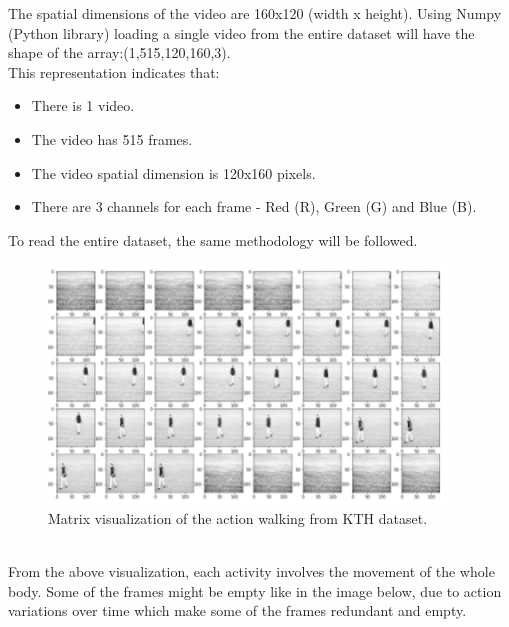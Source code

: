 The spatial dimensions of the video are 160x120 (width x height). Using Numpy (Python library) loading a single video from the entire dataset will have the shape of the array:(1,515,120,160,3).\\
This representation indicates that:
\begin{itemize}
\item There is 1 video.
\item The video has 515 frames.
\item The video spatial dimension is 120x160 pixels.
\item There are 3 channels for each frame - Red (R), Green (G) and Blue (B).
\end{itemize}
To read the entire dataset, the same methodology will be followed.\\

\begin{figure}[ht]
\centering
\includegraphics{Figures/wa1}
\decoRule
\caption[Matrix visualization of the action walking from KTH dataset.]{Matrix visualization of the action walking from KTH dataset.}
\label{fig:la}
\end{figure}\\

From the above visualization, each activity involves the movement of the whole body. Some of the frames might be empty like in the image below, due to action variations over time which make some of the frames redundant and empty.

